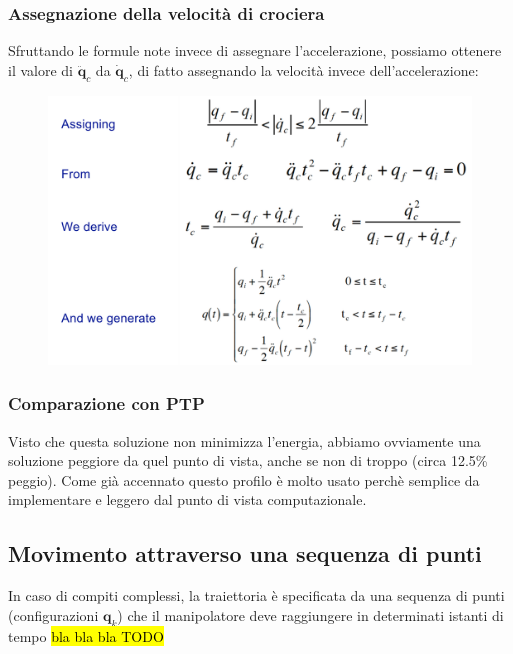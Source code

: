 \vspace*{10pt}
\subsubsection{Assegnazione della velocità di crociera}
Sfruttando le formule note invece di assegnare l'accelerazione, possiamo ottenere il valore di $\bm{\ddot{q}}_c$ da $\bm{\dot{q}}_c$, di fatto assegnando la velocità invece dell'accelerazione:
\begin{figure}[H]
	\centering
	\includegraphics[width=0.9\linewidth]{images/trajectories_15}
	\label{fig:trajectories15}
\end{figure}



\vspace*{10pt}
\subsubsection{Comparazione con PTP}
Visto che questa soluzione non minimizza l'energia, abbiamo ovviamente una soluzione peggiore da quel punto di vista, anche se non di troppo (circa 12.5\% peggio). Come già accennato questo profilo è molto usato perchè semplice da implementare e leggero dal punto di vista computazionale.





\vspace*{15pt}
\subsection{Movimento attraverso una sequenza di punti}
In caso di compiti complessi, la traiettoria è specificata da una sequenza di punti (configurazioni $\bm{q}_k$) che il manipolatore deve raggiungere in determinati istanti di tempo \hl{bla bla bla TODO}
